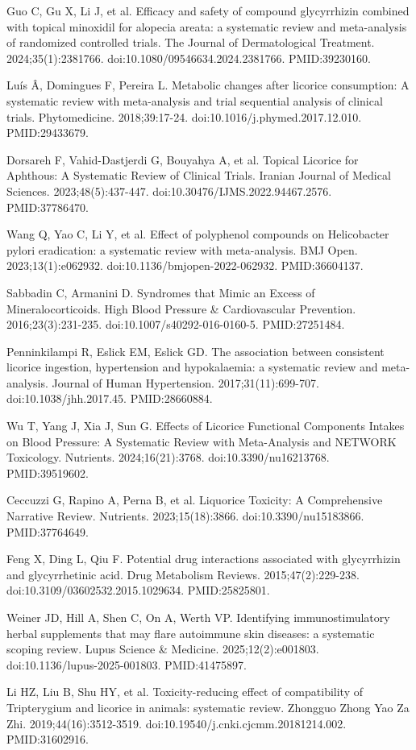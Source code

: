 \documentclass[11pt,oneside]{book}
\newcommand{\reff}[2]{\par\hangindent=7mm\hangafter=1\noindent[#1]\hspace{2mm}#2\par}
\begin{document}
\reff{33}{Guo C, Gu X, Li J, et al. Efficacy and safety of compound glycyrrhizin combined with topical minoxidil for alopecia areata: a systematic review and meta-analysis of randomized controlled trials. The Journal of Dermatological Treatment. 2024;35(1):2381766. doi:10.1080/09546634.2024.2381766. PMID:39230160.}
\reff{34}{Luís Â, Domingues F, Pereira L. Metabolic changes after licorice consumption: A systematic review with meta-analysis and trial sequential analysis of clinical trials. Phytomedicine. 2018;39:17-24. doi:10.1016/j.phymed.2017.12.010. PMID:29433679.}
\reff{35}{Dorsareh F, Vahid-Dastjerdi G, Bouyahya A, et al. Topical Licorice for Aphthous: A Systematic Review of Clinical Trials. Iranian Journal of Medical Sciences. 2023;48(5):437-447. doi:10.30476/IJMS.2022.94467.2576. PMID:37786470.}
\reff{36}{Wang Q, Yao C, Li Y, et al. Effect of polyphenol compounds on Helicobacter pylori eradication: a systematic review with meta-analysis. BMJ Open. 2023;13(1):e062932. doi:10.1136/bmjopen-2022-062932. PMID:36604137.}
\reff{37}{Sabbadin C, Armanini D. Syndromes that Mimic an Excess of Mineralocorticoids. High Blood Pressure \& Cardiovascular Prevention. 2016;23(3):231-235. doi:10.1007/s40292-016-0160-5. PMID:27251484.}
\reff{38}{Penninkilampi R, Eslick EM, Eslick GD. The association between consistent licorice ingestion, hypertension and hypokalaemia: a systematic review and meta-analysis. Journal of Human Hypertension. 2017;31(11):699-707. doi:10.1038/jhh.2017.45. PMID:28660884.}
\reff{39}{Wu T, Yang J, Xia J, Sun G. Effects of Licorice Functional Components Intakes on Blood Pressure: A Systematic Review with Meta-Analysis and NETWORK Toxicology. Nutrients. 2024;16(21):3768. doi:10.3390/nu16213768. PMID:39519602.}
\reff{40}{Ceccuzzi G, Rapino A, Perna B, et al. Liquorice Toxicity: A Comprehensive Narrative Review. Nutrients. 2023;15(18):3866. doi:10.3390/nu15183866. PMID:37764649.}
\reff{41}{Feng X, Ding L, Qiu F. Potential drug interactions associated with glycyrrhizin and glycyrrhetinic acid. Drug Metabolism Reviews. 2015;47(2):229-238. doi:10.3109/03602532.2015.1029634. PMID:25825801.}
\reff{42}{Weiner JD, Hill A, Shen C, On A, Werth VP. Identifying immunostimulatory herbal supplements that may flare autoimmune skin diseases: a systematic scoping review. Lupus Science \& Medicine. 2025;12(2):e001803. doi:10.1136/lupus-2025-001803. PMID:41475897.}
\reff{43}{Li HZ, Liu B, Shu HY, et al. Toxicity-reducing effect of compatibility of Tripterygium and licorice in animals: systematic review. Zhongguo Zhong Yao Za Zhi. 2019;44(16):3512-3519. doi:10.19540/j.cnki.cjcmm.20181214.002. PMID:31602916.}
\end{document}

